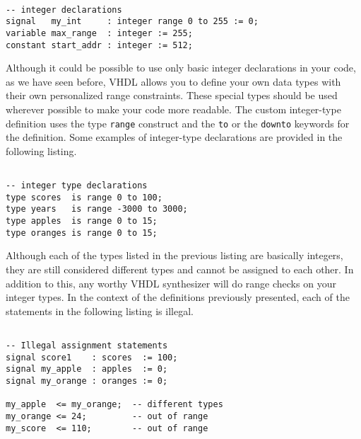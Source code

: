 \noindent
\begin{minipage}{0.99\linewidth}
\begin{lstlisting}

-- integer declarations
signal   my_int     : integer range 0 to 255 := 0;
variable max_range  : integer := 255;
constant start_addr : integer := 512;
\end{lstlisting}
\end{minipage}

Although it could be possible to use only basic integer declarations in your code, as we have seen before, VHDL allows you to define your own data types with their own personalized range constraints. These special types should be used wherever possible to make your code more readable. The custom integer-type definition uses the type \texttt{range} construct and the \texttt{to} or the \texttt{downto} keywords for the definition. Some examples of integer-type declarations are provided in the following listing.
\vspace{8pt}

\noindent
\begin{minipage}{0.99\linewidth}
\begin{lstlisting}

-- integer type declarations
type scores  is range 0 to 100;
type years   is range -3000 to 3000;
type apples  is range 0 to 15;
type oranges is range 0 to 15;
\end{lstlisting}
\end{minipage}

Although each of the types listed in the previous listing are basically integers, they are still considered different types and cannot be assigned to each other. In addition to this, any worthy VHDL synthesizer will do range checks on your integer types. In the context of the definitions previously presented, each of the statements in the following listing is illegal.
\vspace{8pt}

\noindent
\begin{minipage}{0.99\linewidth}
\begin{lstlisting}

-- Illegal assignment statements
signal score1    : scores  := 100;
signal my_apple  : apples  := 0;
signal my_orange : oranges := 0;

my_apple  <= my_orange;  -- different types
my_orange <= 24;         -- out of range
my_score  <= 110;        -- out of range
\end{lstlisting}
\end{minipage}

